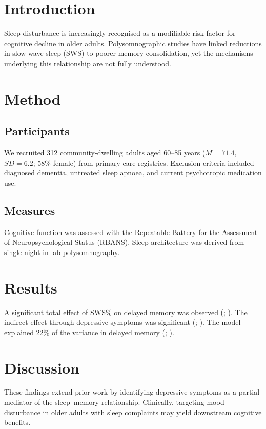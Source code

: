 \section{Introduction}

Sleep disturbance is increasingly recognised as a modifiable risk factor
for cognitive decline in older adults. Polysomnographic studies have linked
reductions in slow-wave sleep (SWS) to poorer memory consolidation, yet the
mechanisms underlying this relationship are not fully understood.

\section{Method}

\subsection{Participants}

We recruited 312 community-dwelling adults aged 60--85 years ($M = 71.4$,
$SD = 6.2$; 58\% female) from primary-care registries. Exclusion criteria
included diagnosed dementia, untreated sleep apnoea, and current
psychotropic medication use.

\subsection{Measures}

Cognitive function was assessed with the Repeatable Battery for the
Assessment of Neuropsychological Status (RBANS). Sleep architecture was
derived from single-night in-lab polysomnography.

\section{Results}

A significant total effect of SWS\% on delayed memory was observed
(; ). The indirect effect through depressive
symptoms was significant (; ).
The model explained 22\% of the variance in delayed memory
(; ).

\section{Discussion}

These findings extend prior work by identifying depressive symptoms as a
partial mediator of the sleep--memory relationship. Clinically, targeting
mood disturbance in older adults with sleep complaints may yield
downstream cognitive benefits.

\printdisclosures

\printbibliography


